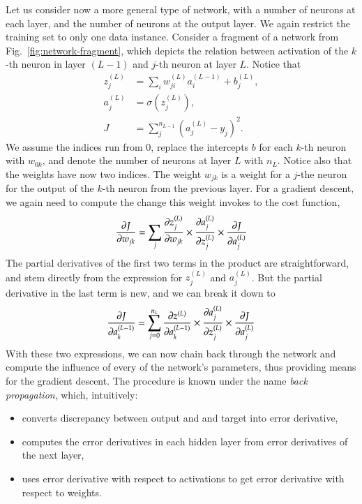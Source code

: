\begin{refsection}
Let us consider now a more general type of network, with a number of neurons at each layer, and the number of neurons at the output layer. We again restrict the training set to only one data instance. Consider a fragment of a network from Fig.~\ref{fig:network-fragment}, which depicts the relation between activation of the $k$-th neuron in layer $(L-1)$ and $j$-th neuron at layer $L$. Notice that
\begin{align}
z_j^{(L)} & = \sum_i w_{ji}^{(L)} a_i^{(L-1)} + b_j^{(L)}, \\
a_j^{(L)} & = \sigma(z_j^{(L)}), \\
J & = \sum_j^{n_{L-1}}(a_j^{(L)}-y_j)^2.
\end{align}
We assume the indices run from 0, replace the intercepts $b$ for each $k$-th neuron with $w_{0k}$, and denote the number of neurons at layer $L$ with $n_L$. Notice also that the weights have now two indices. The weight $w_{jk}$ is a weight for a $j$-the neuron for the output of the $k$-th neuron from the previous layer. For a gradient descent, we again need to compute the change this weight invokes to the cost function,
\begin{equation}
\frac{\partial J}{\partial w_{jk}}=\sum_j\frac{\partial z_j^{(L)}}{\partial w_{jk}} \times \frac{\partial a_j^{(L)}}{\partial z_j^{(L)}} \times \frac{\partial J}{\partial a_j^{(L)}}
\end{equation}
The partial derivatives of the first two terms in the product are straightforward, and stem directly from the expression for $z_j^{(L)}$ and $a_j^{(L)}$. But the partial derivative in the last term is new, and we can break it down to
\begin{equation}
\frac{\partial J}{\partial a_k^{(L-1)}} = \sum_{j=0}^{n_L} \frac{\partial z^{(L)}}{\partial a_k^{(L-1)}} \times \frac{\partial a_j^{(L)}}{\partial z_j^{(L)}} \times \frac{\partial J}{\partial a_j^{(L)}}
\end{equation}
With these two expressions, we can now chain back through the network and compute the influence of every of the network's parameters, thus providing means for the gradient descent. The procedure is known under the name {\em back propagation}, which, intuitively:
\begin{itemize}
	\item converts discrepancy between output and and target into error derivative,
	\item computes the error derivatives in each hidden layer from error derivatives of the next layer,
	\item uses error derivative with respect to activations to get error derivative with respect to weights.
\end{itemize}


\end{refsection}
